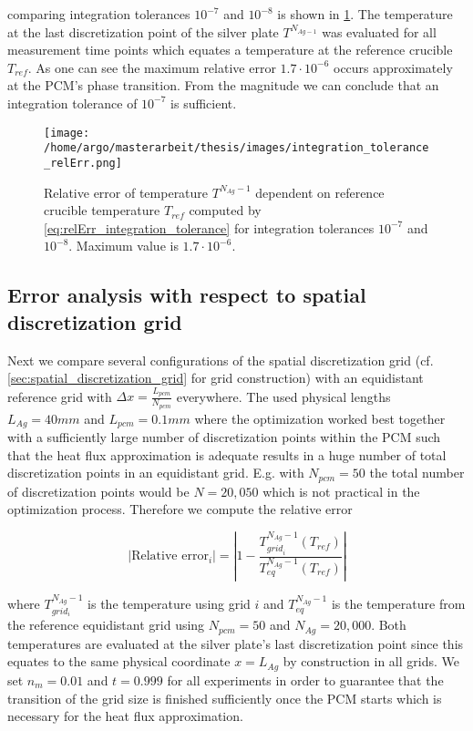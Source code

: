\documentclass{scrartcl}[12pt, halfparskip]
\numberwithin{equation}{section}
\numberwithin{figure}{section}
\numberwithin{table}{section}
\begin{document}
comparing integration tolerances $10^{-7}$ and $10^{-8}$  is shown in \cref{fig:integration_tolerance_error}.
The temperature at the last discretization point of the silver plate $T^{N_{Ag-1}}$ was evaluated for all measurement time points which equates a temperature at the reference crucible $T_{ref}$. 
As one can see the maximum relative error $1.7 \cdot 10^{-6}$ occurs approximately at the PCM's phase transition. 
From the magnitude we can conclude that an integration tolerance of $10^{-7}$ is sufficient. \\


\begin{figure}[H]
	\centering
	\texttt{[image: /home/argo/masterarbeit/thesis/images/integration\_tolerance\_relErr.png]}
	\caption{Relative error of temperature $T^{N_{Ag}-1}$ dependent on reference crucible temperature $T_{ref}$ computed by \cref{eq:relErr_integration_tolerance} for integration tolerances $10^{-7}$ and $10^{-8}$. Maximum value is $1.7 \cdot 10^{-6}$.}
	\label{fig:integration_tolerance_error}
\end{figure}


\subsection{Error analysis with respect to spatial discretization grid}
Next we compare several configurations of the spatial discretization grid (cf. \cref{sec:spatial_discretization_grid} for grid construction) with an equidistant reference grid with $\Delta x = \frac{L_{pcm}}{N_{pcm}}$ everywhere. The used physical lengths $L_{Ag}=40mm$ and $L_{pcm}=0.1mm$ where the optimization worked best together with a sufficiently large number of discretization points within the PCM such that the heat flux approximation is adequate results in a huge number of total discretization points in an equidistant grid. E.g. with $N_{pcm}=50$ the total number of discretization points would be $N=20,050$ which is not practical in the optimization process. Therefore we compute the relative error

\begin{equation}
	| \text{Relative error}_i| = \left| 1 - \frac{T_{{grid}_i}^{N_{Ag}-1}(T_{ref})}{T_{eq}^{N_{Ag}-1}(T_{ref})} \right|
	\label{eq:relErr_grid}
\end{equation}

where $T_{grid_i}^{N_{Ag}-1}$ is the temperature using grid $i$ and $T_{eq}^{N_{Ag}-1}$ is the temperature from the reference equidistant grid using $N_{pcm}=50$ and $N_{Ag}=20,000$. Both temperatures are evaluated at the silver plate's last discretization point since this equates to the same physical coordinate $x=L_{Ag}$ by construction in all grids. 
We set $n_m=0.01$ and $t=0.999$ for all experiments in order to guarantee that the transition of the grid size is finished sufficiently once the PCM starts which is necessary for the heat flux approximation. \\
\end{document}
